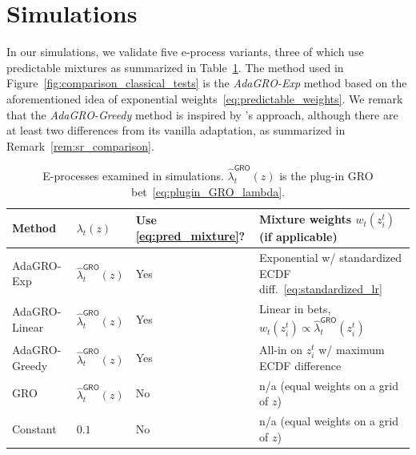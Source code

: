 \documentclass[12pt,twoside]{article}
\theoremstyle{plain}
\theoremstyle{definition}
\theoremstyle{remark}
\begin{document}
\section{Simulations}\label{sec:simulations}

In our simulations, we validate five e-process variants, three of which use predictable mixtures as summarized in Table~\ref{tbl:methods_summary}. 
The method used in Figure~\ref{fig:comparison_classical_tests} is the \emph{AdaGRO-Exp} method based on the aforementioned idea of exponential weights~\eqref{eq:predictable_weights}. 
We remark that the \emph{AdaGRO-Greedy} method is inspired by \citet{shekhar2023nonparametric}'s approach, although there are at least two differences from its vanilla adaptation, as summarized in Remark~\ref{rem:sr_comparison}. 

\begin{table}[t]
    \centering
    \begin{tabular}{llll}
    \toprule
    \textbf{Method} & $\lambda_t(z)$ & \textbf{Use \eqref{eq:pred_mixture}?} & \textbf{Mixture weights $w_t(z_i^t)$} (if applicable) \\
    \midrule
    AdaGRO-Exp & $\hat\lambda_t^\textsf{GRO}(z)$ & Yes & Exponential w/ {standardized} ECDF diff.~\eqref{eq:standardized_lr} \\
    AdaGRO-Linear & $\hat\lambda_t^\textsf{GRO}(z)$ & Yes & Linear in bets, $w_t(z_i^t) \propto \hat\lambda_t^\textsf{GRO}(z_i^t)$ \\
    AdaGRO-Greedy & $\hat\lambda_t^\textsf{GRO}(z)$ & Yes & All-in on $z_i^t$ w/ maximum ECDF difference \\
    GRO & $\hat\lambda_t^\textsf{GRO}(z)$ & No & n/a (equal weights on a grid of $z$) \\
    Constant & $0.1$ & No & n/a (equal weights on a grid of $z$) \\
    \bottomrule
    \end{tabular}
    \caption{E-processes examined in simulations. $\hat\lambda_t^\textsf{GRO}(z)$ is the plug-in GRO bet~\eqref{eq:plugin_GRO_lambda}.}
    \label{tbl:methods_summary}
\end{table}
\end{document}
